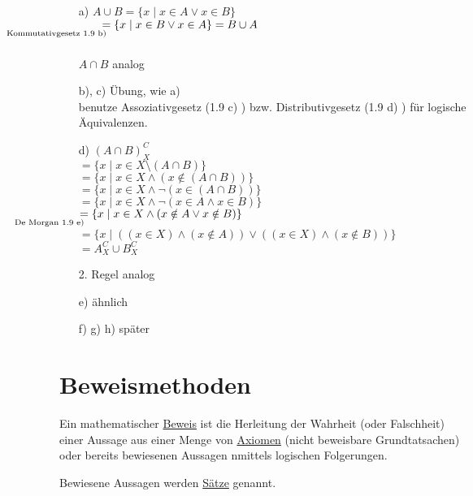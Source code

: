 \documentclass[a4paper, 12pt, twoside] {article}
\begin{document}
\begin{itemize}
	\item[a)]
		$A \cup B = \{x \mid x \in A \lor x \in B\}$ \\
		$\qquad \underset{\mathllap{\text{Kommutativgesetz 1.9 b)}}}{=} \{x \mid x \in B \lor x \in A\} = B \cup A$ \\		
		\hfill \\		
		$A \cap B$ analog
		
	\item[b), c)]
		Übung, wie a) \\
		benutze Assoziativgesetz (1.9 c) ) bzw. Distributivgesetz (1.9 d) ) für logische Äquivalenzen.
		
	\item[d)]
		$(A \cap B)^C_X$ \\
		$ = \{x \mid x \in X \setminus (A \cap B) \}$ \\
		$ = \{x \mid x \in X \land (x \notin (A \cap B)) \}$ \\
		$ = \{x \mid x \in X \land \neg (x \in (A \cap B)) \}$ \\
		$ = \{x \mid x \in X \land \neg (x \in A \land x \in B) \}$ \\
		$ \underset{\mathllap{\text{De Morgan 1.9 e)}}}{=} \{x \mid x \in X \land (x \notin A \lor x \notin B)\}$ \\
		$ = \{x \mid ((x \in X) \land (x \notin A)) \lor ((x \in X) \land (x \notin B)) \}$ \\
		$ = A^C_X \cup B^C_X$
		
		2. Regel analog
		
	\item[e)]
		ähnlich
	\item[f) g) h)]
		später
\end{itemize}

\section{Beweismethoden}

Ein mathematischer \underline{Beweis} ist die Herleitung der Wahrheit (oder Falschheit) einer Aussage aus einer Menge von \underline{Axiomen} (nicht beweisbare Grundtatsachen) oder bereits bewiesenen Aussagen nmittels logischen Folgerungen.

Bewiesene Aussagen werden \underline{Sätze} genannt.

\hfill
\end{document}
